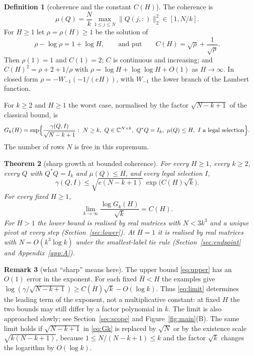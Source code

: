 \documentclass[11pt,a4paper]{article}
\newtheorem{theorem}{Theorem}[section]
\theoremstyle{definition}
\newtheorem{definition}[theorem]{Definition}
\newtheorem{remark}[theorem]{Remark}
\numberwithin{equation}{section}
\newcommand{\C}{\mathbb C}
\begin{document}
\begin{definition}[coherence and the constant $C(H)$]
The coherence is
\begin{equation}\label{eq:coh}
  \mu(Q)=\frac Nk\max_{1\le j\le N}\|Q(j,:)\|_2^2\in[1,N/k].
\end{equation}
For $H\ge1$ let $\rho=\rho(H)\ge1$ be the solution of
\begin{equation}\label{eq:CH}
  \rho-\log\rho=1+\log H,\qquad\text{and put}\qquad C(H)=\sqrt{\rho}+\frac1{\sqrt{\rho}}.
\end{equation}
Then $\rho(1)=1$ and $C(1)=2$; $C$ is continuous and increasing; and $C(H)^2=\rho+2+1/\rho$ with
$\rho=\log H+\log\log H+O(1)$ as $H\to\infty$. In closed form $\rho=-W_{-1}(-1/(eH))$, with $W_{-1}$ the lower branch
of the Lambert function.
\end{definition}

For $k\ge2$ and $H\ge1$ the worst case, normalised by the factor $\sqrt{N-k+1}$ of the classical bound, is
\begin{equation}\label{eq:Gk}
 G_k(H)=\sup\Bigl\{\frac{\gamma(Q,I)}{\sqrt{N-k+1}}:\ N\ge k,\ Q\in\C^{N\times k},\ Q^*Q=I_k,\ \mu(Q)\le H,\
 I\text{ a legal selection}\Bigr\}.
\end{equation}
The number of rows $N$ is free in this supremum.

\begin{theorem}[sharp growth at bounded coherence]\label{thm:main}
For every $H\ge1$, every $k\ge2$, every $Q$ with $Q^*Q=I_k$ and $\mu(Q)\le H$, and every legal selection $I$,
\begin{equation}\label{eq:upper}
 \gamma(Q,I)\le\sqrt{e(N-k+1)}\,\exp\bigl(C(H)\sqrt k\bigr).
\end{equation}
For every fixed $H\ge1$,
\begin{equation}\label{eq:limit}
  \lim_{k\to\infty}\frac{\log G_k(H)}{\sqrt k}=C(H).
\end{equation}
For $H>1$ the lower bound is realised by real matrices with $N<3k^3$ and a unique pivot at every step
(Section~\ref{sec:lower}). At $H=1$ it is realised by real matrices with $N=O(k^3\log k)$ under the
smallest-label tie rule (Section~\ref{sec:endpoint} and Appendix~\ref{app:A}).
\end{theorem}

\begin{remark}[what ``sharp'' means here]\label{rem:sharp}
The upper bound \eqref{eq:upper} has an $O(1)$ error in the exponent. For each fixed $\bar H<H$ the examples give
$\log(\gamma/\sqrt{N-k+1})\ge C(\bar H)\sqrt k-O(\log k)$. Thus \eqref{eq:limit} determines the leading term of the
exponent, not a multiplicative constant: at fixed $H$ the two bounds may still differ by a factor polynomial in $k$.
The limit is also approached slowly; see Section~\ref{sec:scope} and Figure~\ref{fig:main}(B). The same limit holds if
$\sqrt{N-k+1}$ in \eqref{eq:Gk} is replaced by $\sqrt N$ or by the existence scale $\sqrt{k(N-k+1)}$, because
$1\le N/(N-k+1)\le k$ and the factor $\sqrt k$ changes the logarithm by $O(\log k)$.
\end{remark}
\end{document}
